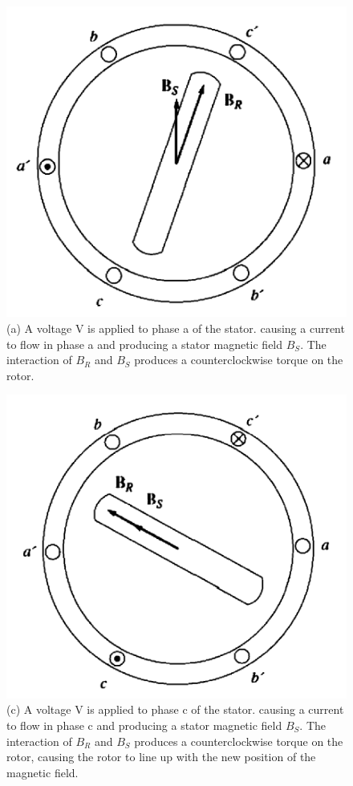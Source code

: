 \documentclass[journal]{IEEEtran}
\begin{document}
\begin{figure}[h]
    \centering
    \includegraphics[scale=0.39]{Stepper/fig 10-39-a.PNG}
    \caption{(a) A voltage V is applied to phase a of the stator. causing a current to flow in phase a and producing a stator magnetic field $B_S$. The interaction of $B_R$ and $B_S$ produces a counterclockwise torque on the rotor. }
    \label{fig:Stepper 10-39-a}
\end{figure}

\begin{figure}[h]
    \centering
    \includegraphics[scale=0.39]{Stepper/fig 10-39-c.PNG}
    \caption{(c) A voltage V is applied to phase c of the stator. causing a current to flow in phase c and producing a stator magnetic field $B_S$. The interaction of $B_R$ and $B_S$ produces a counterclockwise torque on the rotor, causing the rotor to line up with the new position of the magnetic field.}
    \label{fig:Stepper 10-39-c}
\end{figure}
\end{document}
